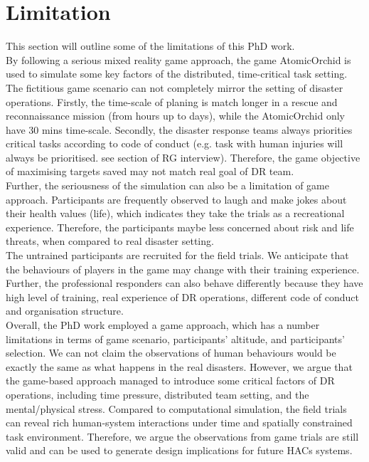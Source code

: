 \section{Limitation}
This section will outline some of the limitations of this PhD work. \\

By following a serious mixed reality game approach, the game AtomicOrchid is used to simulate some key factors of the distributed, time-critical task setting.  The fictitious game scenario can not completely mirror the setting of disaster operations. Firstly, the time-scale of planing is match longer in a rescue and reconnaissance mission (from hours up to days), while the AtomicOrchid only have 30 mins time-scale. Secondly, the disaster response teams always priorities critical tasks according to code of conduct (e.g. task with human injuries will always be prioritised. see section of RG interview). Therefore, the game objective of maximising targets saved may not match real goal of DR team.  \\

Further, the seriousness of the simulation can also be a limitation of game approach. Participants are frequently observed to laugh and make jokes about their health values (life), which indicates they take the trials as a recreational experience. Therefore, the participants maybe less concerned about risk and life threats, when compared to real disaster setting. \\

The untrained participants are recruited for the field trials. We anticipate that the behaviours of players in the game may change with their training experience. Further, the professional responders can also behave differently because they have high level of training, real experience of DR operations, different code of conduct and organisation structure.\\

Overall, the PhD work employed a game approach, which has a number limitations in terms of game scenario, participants' altitude, and participants' selection.  We can not claim the observations of human behaviours would be exactly the same as what happens in the real disasters. However, we argue that the game-based approach managed to introduce some critical factors of DR operations, including time pressure, distributed team setting, and the mental/physical stress. Compared to computational simulation, the field trials can reveal rich human-system interactions under time and spatially constrained task environment. Therefore, we argue the observations from game trials are still valid and can be used to generate design implications for future HACs systems. 


